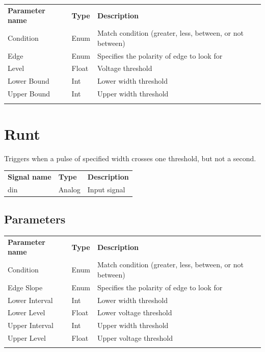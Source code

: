 \begin{tabularx}{16cm}{llX}
\thickhline
\textbf{Parameter name} & \textbf{Type} & \textbf{Description} \\
\thickhline
Condition & Enum & Match condition (greater, less, between, or not between) \\
\thickhline
Edge & Enum & Specifies the polarity of edge to look for\\
\thickhline
Level & Float & Voltage threshold\\
\thickhline
Lower Bound & Int & Lower width threshold\\
\thickhline
Upper Bound & Int & Upper width threshold\\
\thickhline
\end{tabularx}

\section{Runt}

Triggers when a pulse of specified width crosses one threshold, but not a second.

\begin{tabularx}{16cm}{llX}
\thickhline
\textbf{Signal name} & \textbf{Type} & \textbf{Description} \\
\thickhline
din & Analog & Input signal \\
\end{tabularx}

\subsection{Parameters}

\begin{tabularx}{16cm}{llX}
\thickhline
\textbf{Parameter name} & \textbf{Type} & \textbf{Description} \\
\thickhline
Condition & Enum & Match condition (greater, less, between, or not between) \\
\thickhline
Edge Slope & Enum & Specifies the polarity of edge to look for\\
\thickhline
Lower Interval & Int & Lower width threshold\\
\thickhline
Lower Level & Float & Lower voltage threshold\\
\thickhline
Upper Interval & Int & Upper width threshold\\
\thickhline
Upper Level & Float & Upper voltage threshold\\
\thickhline
\end{tabularx}

